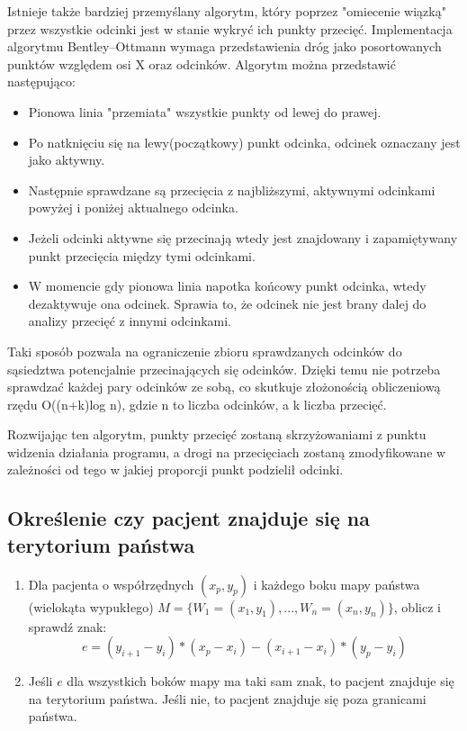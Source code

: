 \documentclass[10pt,a4paper]{article}
\begin{document}
Istnieje także bardziej przemyślany algorytm, który poprzez "omiecenie wiązką" przez wszystkie odcinki jest w stanie wykryć ich punkty przecięć.
Implementacja algorytmu Bentley–Ottmann wymaga przedstawienia dróg jako posortowanych punktów względem osi X oraz odcinków. Algorytm można przedstawić następująco:
\begin{itemize}
    \item Pionowa linia "przemiata" wszystkie punkty od lewej do prawej.
    \item Po natknięciu się na lewy(początkowy) punkt odcinka, odcinek oznaczany jest jako aktywny.
    \item Następnie sprawdzane są przecięcia z najbliższymi, aktywnymi odcinkami powyżej i poniżej aktualnego odcinka.
    \item Jeżeli odcinki aktywne się przecinają wtedy jest znajdowany i zapamiętywany punkt przecięcia między tymi odcinkami.
    \item W momencie gdy pionowa linia napotka końcowy punkt odcinka, wtedy dezaktywuje ona odcinek. Sprawia to, że odcinek nie jest brany dalej do analizy przecięć z innymi odcinkami.
\end{itemize}
Taki sposób pozwala na ograniczenie zbioru sprawdzanych odcinków do sąsiedztwa potencjalnie przecinających się odcinków.
Dzięki temu nie potrzeba sprawdzać każdej pary odcinków ze sobą, co skutkuje złożonością obliczeniową rzędu O((n+k)log n), gdzie n to liczba odcinków, a k liczba przecięć.

Rozwijając ten algorytm, punkty przecięć zostaną skrzyżowaniami z punktu widzenia działania programu, a drogi na przecięciach zostaną zmodyfikowane w zależności od tego w jakiej proporcji punkt podzielił odcinki.


\subsection{Określenie czy pacjent znajduje się na terytorium państwa}

\begin{enumerate}
    \item Dla pacjenta o współrzędnych $(x_p,y_p)$ i każdego boku mapy państwa (wielokąta wypukłego) $M=\{W_1=(x_1,y_1), ..., W_n=(x_n,y_n)\}$, oblicz i sprawdź znak:
    $$e=(y_{i+1}-y_i)*(x_p-x_i)-(x_{i+1}-x_i)*(y_p-y_i)$$
    \item Jeśli $e$ dla wszystkich boków mapy ma taki sam znak, to pacjent znajduje się na terytorium państwa. Jeśli nie, to pacjent znajduje się poza granicami państwa.
\end{enumerate}
\end{document}
